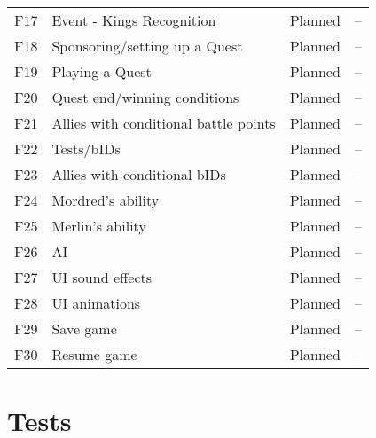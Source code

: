 \documentclass[10pt,a4paper]{article}
\begin{document}
\begin{center}
\begin{tabular}{l l l l }
F17 & Event - Kings Recognition & Planned & --\\
F18 & Sponsoring/setting up a Quest & Planned & --\\
F19 & Playing a Quest & Planned & --\\
F20 & Quest end/winning conditions & Planned & --\\
F21 & Allies with conditional battle points & Planned & --\\
F22 & Tests/bIDs & Planned & --\\
F23 & Allies with conditional bIDs & Planned & --\\
F24 & Mordred's ability & Planned & --\\
F25 & Merlin's ability & Planned & --\\
F26 & AI & Planned & --\\
F27 & UI sound effects & Planned & --\\
F28 & UI animations & Planned & --\\
F29 & Save game & Planned & --\\
F30 & Resume game & Planned & --\\
\end{tabular}
\end{center}
\newpage
\section*{Tests}
\end{document}
